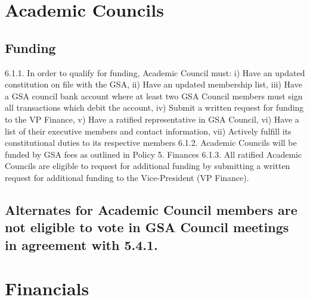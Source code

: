 \section{Academic Councils }
\subsection{Funding }
6.1.1. In order to qualify for funding, Academic Council must: 
i) Have an updated constitution on file with the GSA, 
ii) Have an updated membership list, 
iii) Have a GSA council bank account where at least two GSA Council 
members must sign all transactions which debit the account, 
iv) Submit a written request for funding to the VP Finance, 
v) Have a ratified representative in GSA Council, 
vi) Have a list of their executive members and contact information, 
vii) Actively fulfill its constitutional duties to its respective members 
6.1.2. Academic Councils will be funded by GSA fees as outlined in Policy 5. Finances 
6.1.3. All ratified Academic Councils are eligible to request for additional 
funding by submitting a written request for additional funding to the 
Vice-President (VP Finance). 
\subsection{Alternates for Academic Council members are not eligible to vote 
 in GSA Council meetings in agreement with 5.4.1. }
\section{Financials }
